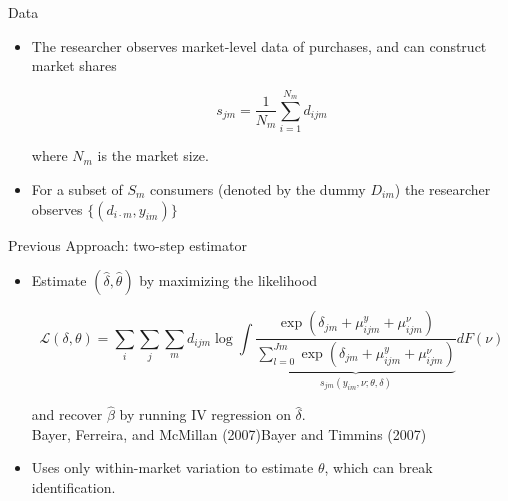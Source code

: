 \begin{frame}{Data}
    \begin{itemize}
        \item The researcher observes market-level data of purchases, and can construct market shares
    
            \begin{equation}
                s_{jm} = \frac{1}{N_m}\sum_{i=1}^{N_m}d_{ijm}
            \end{equation}
            
            where $N_m$ is the market size.
            
        \item For a subset of $S_m$ consumers (denoted by the dummy $D_{im}$) the researcher observes $\{(d_{i\cdot m},y_{im})\}$
    \end{itemize}
\end{frame}



\begin{frame}{Previous Approach: two-step estimator}

    \begin{itemize}
    
        \item Estimate $(\hat{\delta}, \hat{\theta})$ by maximizing the likelihood
        
        $$\mathcal{L}(\delta,\theta) =  \sum_i\sum_j\sum_m d_{ijm} \log \int \frac{\exp{(\delta_{jm} + \mu_{ijm}^{y} + \mu_{ijm}^{\nu})}}{\underbrace{\sum_{l=0}^{Jm}\exp{(\delta_{jm} + \mu_{ijm}^{y} + \mu_{ijm}^{\nu})}}_{s_{jm}(y_{im},\nu;\theta,\delta)}} dF(\nu)$$
        
        and recover $\hat{\beta}$ by running IV regression on $\hat{\delta}$.\\
        
        {\tiny Bayer, Ferreira, and McMillan (2007)\quad Bayer and Timmins (2007)}
        \item Uses only within-market variation to estimate $\theta$, which can break identification.
    
    \end{itemize}
\end{frame}


